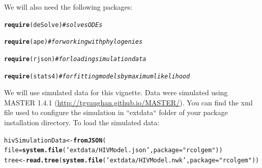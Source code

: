 \documentclass[english]{article}\usepackage[]{graphicx}\usepackage[]{color}
\makeatletter
\newcommand{\hlstr}[1]{\textcolor[rgb]{0.192,0.494,0.8}{#1}}%
\newcommand{\hlcom}[1]{\textcolor[rgb]{0.678,0.584,0.686}{\textit{#1}}}%
\newcommand{\hlstd}[1]{\textcolor[rgb]{0.345,0.345,0.345}{#1}}%
\newcommand{\hlkwb}[1]{\textcolor[rgb]{0.69,0.353,0.396}{#1}}%
\newcommand{\hlkwc}[1]{\textcolor[rgb]{0.333,0.667,0.333}{#1}}%
\newcommand{\hlkwd}[1]{\textcolor[rgb]{0.737,0.353,0.396}{\textbf{#1}}}%
\newenvironment{kframe}{%
 \def\at@end@of@kframe{}%
 \ifinner\ifhmode%
  \def\at@end@of@kframe{\end{minipage}}%
  \begin{minipage}{\columnwidth}%
 \fi\fi%
 \def\FrameCommand##1{\hskip\@totalleftmargin \hskip-\fboxsep
 \colorbox{shadecolor}{##1}\hskip-\fboxsep
     \hskip-\linewidth \hskip-\@totalleftmargin \hskip\columnwidth}%
 \MakeFramed {\advance\hsize-\width
   \@totalleftmargin\z@ \linewidth\hsize
   \@setminipage}}%
 {\par\unskip\endMakeFramed%
 \at@end@of@kframe}
\newenvironment{knitrout}{}{} %
\makeatother
\begin{document}
We will also need the following packages:

\begin{knitrout}
\color{fgcolor}\begin{kframe}
\begin{alltt}
\hlkwd{require}\hlstd{(deSolve)}  \hlcom{# solves ODEs}
\end{alltt}


{\ttfamily\noindent\itshape\color{messagecolor}{\#\# Loading required package: deSolve}}\begin{alltt}
\hlkwd{require}\hlstd{(ape)}  \hlcom{# for working with phylogenies}
\end{alltt}


{\ttfamily\noindent\itshape\color{messagecolor}{\#\# Loading required package: ape}}\begin{alltt}
\hlkwd{require}\hlstd{(rjson)}  \hlcom{# for loading simulation data}
\end{alltt}


{\ttfamily\noindent\itshape\color{messagecolor}{\#\# Loading required package: rjson}}\begin{alltt}
\hlkwd{require}\hlstd{(stats4)}  \hlcom{# for fitting models by maximum likelihood}
\end{alltt}


{\ttfamily\noindent\itshape\color{messagecolor}{\#\# Loading required package: stats4\\\#\# Loading required package: methods}}\end{kframe}
\end{knitrout}


We will use simulated data for this vignette. Data were simulated
using MASTER 1.4.1 (\url{http://tgvaughan.github.io/MASTER/}). You
can find the xml file used to configure the simulation in ``extdata``
folder of your package installation directory. To load the simulated
data: 

\begin{knitrout}
\color{fgcolor}\begin{kframe}
\begin{alltt}
\hlstd{hivSimulationData} \hlkwb{<-} \hlkwd{fromJSON}\hlstd{(}
  \hlkwc{file}\hlstd{=} \hlkwd{system.file}\hlstd{(}\hlstr{'extdata/HIVModel.json'}\hlstd{,} \hlkwc{package} \hlstd{=} \hlstr{"rcolgem"}\hlstd{) )}
\hlstd{tree} \hlkwb{<-} \hlkwd{read.tree}\hlstd{(} \hlkwd{system.file}\hlstd{(}\hlstr{'extdata/HIVModel.nwk'}\hlstd{,} \hlkwc{package} \hlstd{=} \hlstr{"rcolgem"}\hlstd{) )}
\end{alltt}
\end{kframe}
\end{knitrout}
\end{document}
